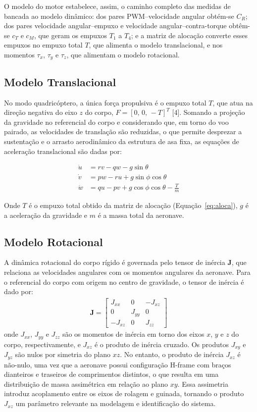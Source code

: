 \documentclass[letterpaper, 10 pt, conference]{ieeeconf}
\begin{document}
O modelo do motor estabelece, assim, o caminho completo das medidas de bancada ao modelo dinâmico: dos pares PWM--velocidade angular obtém-se $C_R$; dos pares velocidade angular--empuxo e velocidade angular--contra-torque obtêm-se $c_T$ e $c_M$, que geram os empuxos $T_1$ a $T_4$; e a matriz de alocação converte esses empuxos no empuxo total $T$, que alimenta o modelo translacional, e nos momentos $\tau_x$, $\tau_y$ e $\tau_z$, que alimentam o modelo rotacional.

\subsection{Modelo Translacional}

No modo quadricóptero, a única força propulsiva é o empuxo total $T$, que atua na direção negativa do eixo $z$ do corpo, $F = [0,\, 0,\, -T]^T$ [4]. Somando a projeção da gravidade no referencial do corpo e considerando que, em torno do voo pairado, as velocidades de translação são reduzidas, o que permite desprezar a sustentação e o arrasto aerodinâmico da estrutura de asa fixa, as equações de aceleração translacional são dadas por:

\begin{align}
\dot{u} &= rv - qw - g\sin\theta \\
\dot{v} &= pw - ru + g\sin\phi\cos\theta \\
\dot{w} &= qu - pv + g\cos\phi\cos\theta - \frac{T}{m}
\end{align}

Onde $T$ é o empuxo total obtido da matriz de alocação (Equação~\eqref{eq:aloca}), $g$ é a aceleração da gravidade e $m$ é a massa total da aeronave.

\subsection{Modelo Rotacional}

A dinâmica rotacional do corpo rígido é governada pelo tensor de inércia $\mathbf{J}$, que relaciona as velocidades angulares com os momentos angulares da aeronave. Para o referencial do corpo com origem no centro de gravidade, o tensor de inércia é dado por:
\begin{align}
\mathbf{J} = \begin{bmatrix}
J_{xx} & 0 & -J_{xz} \\
0 & J_{yy} & 0 \\
-J_{xz} & 0 & J_{zz}
\end{bmatrix}
\end{align}
onde $J_{xx}$, $J_{yy}$ e $J_{zz}$ são os momentos de inércia em torno dos eixos $x$, $y$ e $z$ do corpo, respectivamente, e $J_{xz}$ é o produto de inércia cruzado. Os produtos $J_{xy}$ e $J_{yz}$ são nulos por simetria do plano $xz$. No entanto, o produto de inércia $J_{xz}$ é não-nulo, uma vez que a aeronave possui configuração H-frame com braços dianteiros e traseiros de comprimentos distintos, o que resulta em uma distribuição de massa assimétrica em relação ao plano $xy$. Essa assimetria introduz acoplamento entre os eixos de rolagem e guinada, tornando o produto $J_{xz}$ um parâmetro relevante na modelagem e identificação do sistema.
\end{document}
